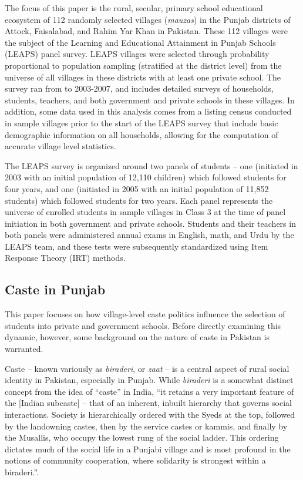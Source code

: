 \documentclass[Eubank_pk_ethnic_sorting.tex]{subfiles}
\begin{document}
The focus of this paper is the rural, secular, primary school educational ecosystem of 112 randomly selected villages (\emph{mauzas}) in the Punjab districts of Attock, Faisalabad, and Rahim Yar Khan in Pakistan. These 112 villages were the subject of the Learning and Educational Attainment in Punjab Schools (LEAPS) panel survey. LEAPS villages were selected through probability proportional to population sampling (stratified at the district level) from the universe of all villages in these districts with at least one private school. The survey ran from to 2003-2007, and includes detailed surveys of households, students, teachers, and both government and private schools in these villages. In addition, some data used in this analysis comes from a listing census conducted in sample villages prior to the start of the LEAPS survey that include basic demographic information on all households, allowing for the computation of accurate village level statistics.

The LEAPS survey is organized around two panels of students -- one (initiated in 2003 with an initial population of 12,110 children) which followed students for four years, and one (initiated in 2005 with an initial population of 11,852 students) which followed students for two years. Each panel represents the universe of enrolled students in sample villages in Class 3 at the time of panel initiation in both government and private schools. Students and their teachers in both panels were administered annual exams in English, math, and Urdu by the LEAPS team, and these tests were subsequently standardized using Item Response Theory (IRT) methods.

\subsection{Caste in Punjab}\label{caste_in_punjab}

This paper focuses on how village-level caste politics influence the selection of students into private and government schools. Before directly examining this dynamic, however, some background on the nature of caste in Pakistan is warranted.

Caste -- known variously as \emph{biraderi}, or \emph{zaat} -- is a central aspect of rural social identity in Pakistan, especially in Punjab. While \emph{biraderi} is a somewhat distinct concept from the idea of ``caste'' in India, ``it retains a very important feature of the [Indian subcaste] -- that of an inherent, inbuilt hierarchy that governs social interactions. Society is hierarchically ordered with the Syeds at the top, followed by the landowning castes, then by the service castes or kammis, and finally by the Musallis, who occupy the lowest rung of the social ladder. This ordering dictates much of the social life in a Punjabi village and is most profound in the notions of community cooperation, where solidarity is strongest within a biraderi.''\citep[p. 29]{Gazdar:2007vt}.
\end{document}
